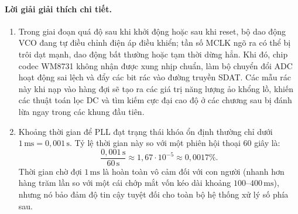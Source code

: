 \paragraph{Lời giải giải thích chi tiết.}
\begin{enumerate}[label=\alph*)]
    \item Trong giai đoạn quá độ sau khi khởi động hoặc sau khi reset, bộ dao động VCO đang tự điều chỉnh điện áp điều khiển; tần số MCLK ngõ ra có thể bị trôi dạt mạnh, dao động bất thường hoặc tạm thời dừng hẳn. Khi đó, chip codec WM8731 không nhận được xung nhịp chuẩn, làm bộ chuyển đổi ADC hoạt động sai lệch và đẩy các bit rác vào đường truyền SDAT. Các mẫu rác này khi nạp vào hàng đợi sẽ tạo ra các giá trị năng lượng ảo khổng lồ, khiến các thuật toán lọc DC và tìm kiếm cực đại cao độ ở các chương sau bị đánh lừa ngay trong các khung đầu tiên.
    \item Khoảng thời gian để PLL đạt trạng thái khóa ổn định thường chỉ dưới $1\,\text{ms} = 0{,}001\,\text{s}$. Tỷ lệ thời gian này so với một phiên hội thoại 60 giây là:
    \[
    \frac{0{,}001\,\text{s}}{60\,\text{s}} \approx 1{,}67\cdot 10^{-5} \approx 0{,}0017\%.
    \]
    Thời gian chờ đợi $1\,\text{ms}$ là hoàn toàn vô cảm đối với con người (nhanh hơn hàng trăm lần so với một cái chớp mắt vốn kéo dài khoảng $100\text{--}400\,\text{ms}$), nhưng nó bảo đảm độ tin cậy tuyệt đối cho toàn bộ hệ thống xử lý số phía sau.
\end{enumerate}

